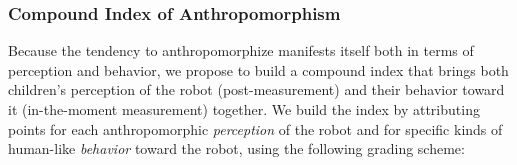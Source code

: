 \documentclass[letterpaper, 10pt, conference]{ieeeconf}
\newcommand{\eg}{{\textit{e.g.~}}}
\begin{document}
\subsubsection{Compound Index of Anthropomorphism}
\label{compound_idx}

%
%

%
Because the tendency to anthropomorphize manifests itself both in terms of
perception and behavior, we propose to build a compound index that brings both
children's perception of the robot (post-measurement) and their behavior toward
it (in-the-moment measurement) together. We build the index by attributing
points for each anthropomorphic \emph{perception} of the robot and for specific
kinds of human-like \emph{behavior} toward the robot, using the following
grading scheme:
\end{document}
